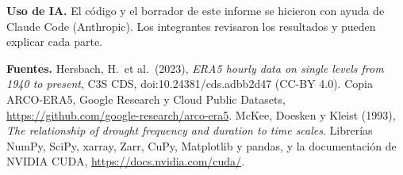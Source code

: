 \documentclass[10pt]{article}
\begin{document}
\textbf{Uso de IA.} El c\'odigo y el borrador de este informe se hicieron con ayuda de Claude Code (Anthropic). Los integrantes revisaron los resultados y pueden explicar cada parte.

\textbf{Fuentes.} Hersbach, H.\ et al.\ (2023), \emph{ERA5 hourly data on single levels from 1940 to present}, C3S CDS, doi:10.24381/cds.adbb2d47 (CC-BY 4.0). Copia ARCO-ERA5, Google Research y Cloud Public Datasets, \url{https://github.com/google-research/arco-era5}. McKee, Doesken y Kleist (1993), \emph{The relationship of drought frequency and duration to time scales}. Librer\'ias NumPy, SciPy, xarray, Zarr, CuPy, Matplotlib y pandas, y la documentaci\'on de NVIDIA CUDA, \url{https://docs.nvidia.com/cuda/}.
\end{document}
